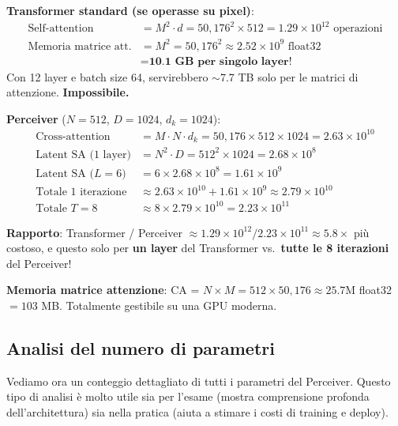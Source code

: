 \documentclass[12pt,a4paper]{article}
\begin{document}
\begin{examplebox}
\textbf{Transformer standard (se operasse su pixel)}:
\begin{align*}
    \text{Self-attention} &= M^2 \cdot d = 50{,}176^2 \times 512 = 1.29 \times 10^{12} \text{ operazioni} \\
    \text{Memoria matrice att.} &= M^2 = 50{,}176^2 \approx 2.52 \times 10^{9} \text{ float32}\\
    &= \textbf{10.1 GB per singolo layer!}
\end{align*}
Con 12 layer e batch size 64, servirebbero $\sim$7.7 TB solo per le matrici di attenzione. \textbf{Impossibile.}

\textbf{Perceiver} ($N = 512$, $D = 1024$, $d_k = 1024$):
\begin{align*}
    \text{Cross-attention} &= M \cdot N \cdot d_k = 50{,}176 \times 512 \times 1024 = 2.63 \times 10^{10} \\
    \text{Latent SA (1 layer)} &= N^2 \cdot D = 512^2 \times 1024 = 2.68 \times 10^{8} \\
    \text{Latent SA ($L = 6$)} &= 6 \times 2.68 \times 10^{8} = 1.61 \times 10^{9} \\
    \text{Totale 1 iterazione} &\approx 2.63 \times 10^{10} + 1.61 \times 10^{9} \approx 2.79 \times 10^{10} \\
    \text{Totale $T = 8$} &\approx 8 \times 2.79 \times 10^{10} = 2.23 \times 10^{11}
\end{align*}

\textbf{Rapporto}: Transformer / Perceiver $\approx 1.29 \times 10^{12} / 2.23 \times 10^{11} \approx 5.8\times$ pi\`u costoso, e questo solo per \textbf{un layer} del Transformer vs.\ \textbf{tutte le 8 iterazioni} del Perceiver!

\textbf{Memoria matrice attenzione}: CA = $N \times M = 512 \times 50{,}176 \approx 25.7$M float32 $= 103$ MB. Totalmente gestibile su una GPU moderna.
\end{examplebox}

\subsection{Analisi del numero di parametri} \label{sec:num_parametri}

Vediamo ora un conteggio dettagliato di tutti i parametri del Perceiver. Questo tipo di analisi \`e molto utile sia per l'esame (mostra comprensione profonda dell'architettura) sia nella pratica (aiuta a stimare i costi di training e deploy).
\end{document}
